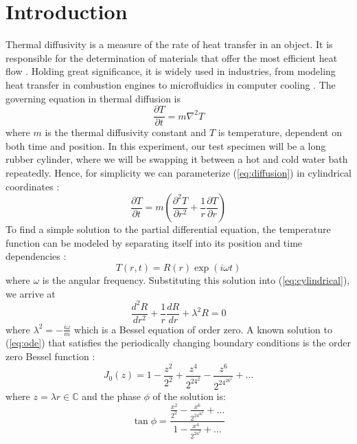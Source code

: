 \documentclass[12pt]{article}
\begin{document}
\section{Introduction}
Thermal diffusivity is a measure of the rate of heat transfer in an object. It is responsible for the determination of materials that offer the most efficient heat flow \autocite{onthermo}. Holding great significance, it is widely used in industries, from modeling heat transfer in combustion engines to microfluidics in computer cooling \autocite{thermoappli}. The governing equation in thermal diffusion is
\begin{equation}
    \frac{\partial T}{\partial t}=m\nabla^2T
    \label{eq:diffusion}
\end{equation}
where $m$ is the thermal diffusivity constant and $T$ is temperature, dependent on both time and position. In this experiment, our test specimen will be a long rubber cylinder, where we will be swapping it between a hot and cold water bath repeatedly. Hence, for simplicity we can parameterize (\ref{eq:diffusion}) in cylindrical coordinates \autocite{manuall}:
\begin{equation}
    \frac{\partial T}{\partial t}=m\left(\frac{\partial^2T}{\partial r^2}+\frac{1}{r}\frac{\partial T}{\partial r}\right)
    \label{eq:cylindrical}
\end{equation}
To find a simple solution to the partial differential equation, the temperature function can be modeled by separating itself into its position and time dependencies \autocite{manuall}:
\begin{equation}
    T(r,t)=R(r)\exp{(i\omega t)}
    \label{eq:seperation}
\end{equation}
where $\omega$ is the angular frequency. Substituting this solution into (\ref{eq:cylindrical}), we arrive at
\begin{equation}
    \frac{d^2R}{dr^2}+\frac{1}{r}\frac{dR}{dr}+\lambda^2R=0
    \label{eq:ode}
\end{equation}
where $\lambda^2=-\frac{i\omega}{m}$ which is a Bessel equation of order zero. A known solution to (\ref{eq:ode}) that satisfies the periodically changing boundary conditions is the order zero Bessel function \autocite{manuall}:
\begin{equation}
    J_0(z)=1-\frac{z^2}{2^2}+\frac{z^4}{2^24^2}-\frac{z^6}{2^24^26^2}+\dots
    \label{eq:bessel}
\end{equation}
where $z=\lambda r\in\mathbb{C}$ and the phase $\phi$ of the solution is:
\begin{equation}
    \tan\phi=\frac{\frac{x^2}{2^2}-\frac{x^6}{2^24^26^2}+\dots}{1-\frac{x^4}{2^24^2}+\dots}
    \label{eq:phase}
\end{equation}
\end{document}
